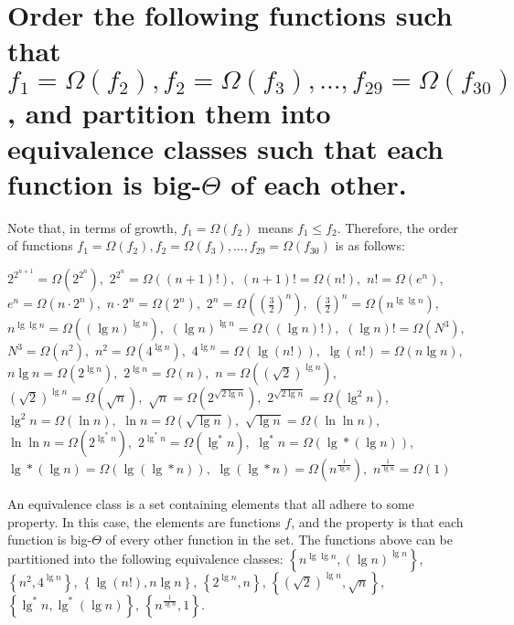 \section[Problem 6]{Order the following functions such that $f_1 = \Omega(f_2), f_2 = \Omega(f_3), ..., f_{29} = \Omega(f_{30})$, and partition them into equivalence classes such that each function is big-$\Theta$ of each other.}

Note that, in terms of growth, $f_1 = \Omega(f_2)$ means $f_1 \leq f_2$. Therefore, the order of functions $f_1 = \Omega(f_2), f_2 = \Omega(f_3), ..., f_{29} = \Omega(f_{30})$ is as follows:

$2^{2^{n + 1}} = \Omega \left(2^{2^n} \right), $
$2^{2^n} = \Omega \left((n + 1)! \right), $
$(n + 1)! = \Omega \left(n! \right), $
$n! = \Omega \left(e^n \right), $
$e^n = \Omega \left(n \cdot 2^n \right), $
$n \cdot 2^n = \Omega \left(2^n \right), $
$2^n = \Omega \left(\left( \frac{3}{2} \right)^n \right), $
$\left( \frac{3}{2} \right)^n = \Omega \left(n^{\lg \lg n} \right), $
$n^{\lg \lg n} = \Omega \left(\left( \lg n \right)^{\lg n} \right), $
$\left( \lg n \right)^{\lg n} = \Omega \left((\lg n)! \right), $
$(\lg n)! = \Omega \left(N^3 \right), $
$N^3 = \Omega \left(n^2 \right), $
$n^2 = \Omega \left(4^{\lg n} \right), $
$4^{\lg n} = \Omega \left(\lg (n!) \right), $
$\lg (n!)  = \Omega \left(n \lg n \right), $
$n \lg n = \Omega \left(2^{\lg n} \right), $
$2^{\lg n} = \Omega \left(n \right), $
$n = \Omega \left(\left( \sqrt{2} \right)^{\lg n} \right), $
$\left( \sqrt{2} \right)^{\lg n} = \Omega \left(\sqrt{n} \right), $
$\sqrt{n} = \Omega \left(2^{\sqrt{2 \lg n}} \right), $
$2^{\sqrt{2 \lg n}} = \Omega \left(\lg ^2 n \right), $
$\lg ^2 n = \Omega \left(\ln n \right), $
$\ln n = \Omega \left(\sqrt{\lg n} \right), $
$\sqrt{\lg n} = \Omega \left(\ln \ln n \right), $
$\ln \ln n = \Omega \left(2^{\lg ^* n} \right), $
$2^{\lg ^* n} = \Omega \left(\lg ^* n \right), $
$\lg ^* n = \Omega \left(\lg * (\lg n) \right), $
$\lg * (\lg n) = \Omega \left(\lg (\lg * n) \right), $
$\lg (\lg * n) = \Omega \left(n^{\frac{1}{\lg n}} \right), $
$n^{\frac{1}{\lg n}} = \Omega (1)$

An equivalence class is a set containing elements that all adhere to some property. In this case, the elements are functions $f$, and the property is that each function is big-$\Theta$ of every other function in the set. The functions above can be partitioned into the following equivalence classes:
$\left\{ n^{\lg \lg n}, \left( \lg n \right)^{\lg n} \right\}$, 
$\left\{ n^2, 4^{\lg n} \right\}$,
$\left\{ \lg(n!), n \lg n \right\}$,
$\left\{ 2^{\lg n}, n \right\}$,
$\left\{ \left( \sqrt{2} \right) ^{\lg n}, \sqrt{n} \right\}$, \\ %
$\left\{ \lg^* n, \lg^* (\lg n) \right\}$,
$\left\{ n^{\frac{1}{\lg n}}, 1 \right\}$.

